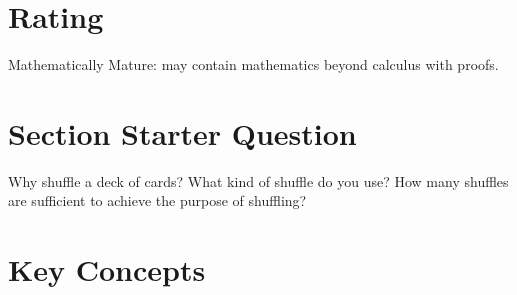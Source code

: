 \documentclass[12pt]{article}
\begin{document}
\myheader \mytitle

\hr


\hr

\usefirefox

\hr



\section*{Rating} %
Mathematically Mature:  may contain mathematics beyond calculus with
proofs.  %

\hr

\section*{Section Starter Question}

Why shuffle a deck of cards?  What kind of shuffle do you use?  How many
shuffles are sufficient to achieve the purpose of shuffling?

\hr

\section*{Key Concepts}
\end{document}
